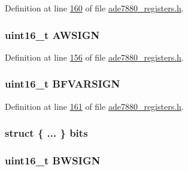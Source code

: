 Definition at line \hyperlink{a00036_source_l00160}{160} of file \hyperlink{a00036_source}{ade7880\-\_\-registers.\-h}.

\hypertarget{a00031_a22c67f22fb72cc4760563226228fd3d1}{
\subsubsection[{A\-W\-S\-I\-G\-N}]{\setlength{\rightskip}{0pt plus 5cm}uint16\-\_\-t A\-W\-S\-I\-G\-N}}\label{df/d61/a00031_a22c67f22fb72cc4760563226228fd3d1}


Definition at line \hyperlink{a00036_source_l00156}{156} of file \hyperlink{a00036_source}{ade7880\-\_\-registers.\-h}.

\hypertarget{a00031_a7bfc6dda668e0f2c865e9c550e859901}{
\subsubsection[{B\-F\-V\-A\-R\-S\-I\-G\-N}]{\setlength{\rightskip}{0pt plus 5cm}uint16\-\_\-t B\-F\-V\-A\-R\-S\-I\-G\-N}}\label{df/d61/a00031_a7bfc6dda668e0f2c865e9c550e859901}


Definition at line \hyperlink{a00036_source_l00161}{161} of file \hyperlink{a00036_source}{ade7880\-\_\-registers.\-h}.

\hypertarget{a00031_adcef82d35bcb2388d5caaae80aab848e}{
\subsubsection[{bits}]{\setlength{\rightskip}{0pt plus 5cm}struct \{ ... \}  bits}}\label{df/d61/a00031_adcef82d35bcb2388d5caaae80aab848e}
\hypertarget{a00031_a62075848f2d34b29d102a5dac93c8680}{
\subsubsection[{B\-W\-S\-I\-G\-N}]{\setlength{\rightskip}{0pt plus 5cm}uint16\-\_\-t B\-W\-S\-I\-G\-N}}\label{df/d61/a00031_a62075848f2d34b29d102a5dac93c8680}



